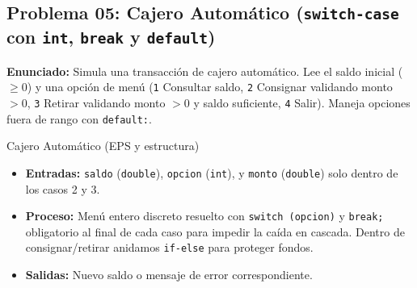 \documentclass[11pt,letterpaper]{article}
\begin{document}
\subsection{Problema 05: Cajero Automático (\texorpdfstring{\texttt{switch-case}}{switch-case} con \texorpdfstring{\texttt{int}}{int}, \texorpdfstring{\texttt{break}}{break} y \texorpdfstring{\texttt{default}}{default})}

\textbf{Enunciado:} Simula una transacción de cajero automático. Lee el saldo inicial ($\ge 0$) y una opción de menú (\texttt{1} Consultar saldo, \texttt{2} Consignar validando monto $> 0$, \texttt{3} Retirar validando monto $> 0$ y saldo suficiente, \texttt{4} Salir). Maneja opciones fuera de rango con \texttt{default:}.

\begin{analisis}{Cajero Automático (EPS y estructura)}
\begin{itemize}
  \item \textbf{Entradas:} \texttt{saldo} (\texttt{double}), \texttt{opcion} (\texttt{int}), y \texttt{monto} (\texttt{double}) solo dentro de los casos 2 y 3.
  \item \textbf{Proceso:} Menú entero discreto resuelto con \texttt{switch (opcion)} y \texttt{break;} obligatorio al final de cada caso para impedir la caída en cascada. Dentro de consignar/retirar anidamos \texttt{if-else} para proteger fondos.
  \item \textbf{Salidas:} Nuevo saldo o mensaje de error correspondiente.
\end{itemize}
\end{analisis}





\end{document}
